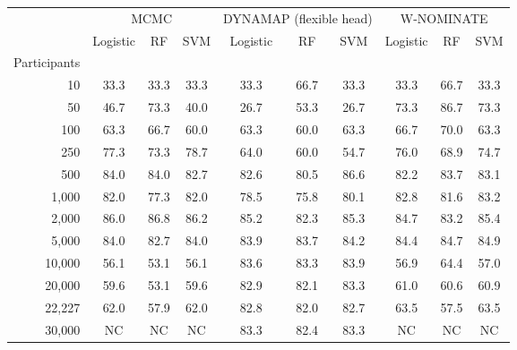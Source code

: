 \begin{tabular}{rccccccccc}
\toprule
 & \multicolumn{3}{c}{MCMC} & \multicolumn{3}{c}{DYNAMAP (flexible head)} & \multicolumn{3}{c}{W-NOMINATE} \\
 & Logistic & RF & SVM & Logistic & RF & SVM & Logistic & RF & SVM \\
Participants &  &  &  &  &  &  &  &  &  \\
\midrule
10 & 33.3 & 33.3 & 33.3 & 33.3 & 66.7 & 33.3 & 33.3 & 66.7 & 33.3 \\
50 & 46.7 & 73.3 & 40.0 & 26.7 & 53.3 & 26.7 & 73.3 & 86.7 & 73.3 \\
100 & 63.3 & 66.7 & 60.0 & 63.3 & 60.0 & 63.3 & 66.7 & 70.0 & 63.3 \\
250 & 77.3 & 73.3 & 78.7 & 64.0 & 60.0 & 54.7 & 76.0 & 68.9 & 74.7 \\
500 & 84.0 & 84.0 & 82.7 & 82.6 & 80.5 & 86.6 & 82.2 & 83.7 & 83.1 \\
1,000 & 82.0 & 77.3 & 82.0 & 78.5 & 75.8 & 80.1 & 82.8 & 81.6 & 83.2 \\
2,000 & 86.0 & 86.8 & 86.2 & 85.2 & 82.3 & 85.3 & 84.7 & 83.2 & 85.4 \\
5,000 & 84.0 & 82.7 & 84.0 & 83.9 & 83.7 & 84.2 & 84.4 & 84.7 & 84.9 \\
10,000 & 56.1 & 53.1 & 56.1 & 83.6 & 83.3 & 83.9 & 56.9 & 64.4 & 57.0 \\
20,000 & 59.6 & 53.1 & 59.6 & 82.9 & 82.1 & 83.3 & 61.0 & 60.6 & 60.9 \\
22,227 & 62.0 & 57.9 & 62.0 & 82.8 & 82.0 & 82.7 & 63.5 & 57.5 & 63.5 \\
30,000 & NC & NC & NC & 83.3 & 82.4 & 83.3 & NC & NC & NC \\
\bottomrule
\end{tabular}
